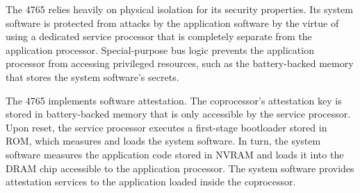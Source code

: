 The 4765 relies heavily on physical isolation for its security properties. Its
system software is protected from attacks by the application software by the
virtue of using a dedicated service processor that is completely separate from
the application processor. Special-purpose bus logic prevents the application
processor from accessing privileged resources, such as the battery-backed
memory that stores the system software's secrets.

The 4765 implements software attestation. The coprocessor's attestation key is
stored in battery-backed memory that is only accessible by the service
processor. Upon reset, the service processor executes a first-stage bootloader
stored in ROM, which measures and loads the system software. In turn, the
system software measures the application code stored in NVRAM and loads it into
the DRAM chip accessible to the application processor. The system software
provides attestation services to the application loaded inside the coprocessor.
